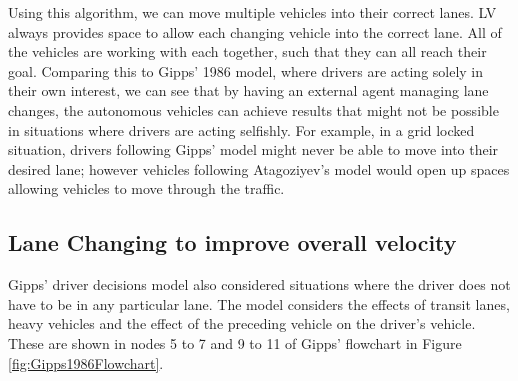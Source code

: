 Using this algorithm, we can move multiple vehicles into their correct lanes. LV always provides space to allow each changing vehicle into the correct lane. All of the vehicles are working with each together, such that they can all reach their goal. Comparing this to Gipps' 1986 model, where drivers are acting solely in their own interest, we can see that by having an external agent managing lane changes, the autonomous vehicles can achieve results that might not be possible in situations where drivers are acting selfishly. For example, in a grid locked situation, drivers following Gipps' model might never be able to move into their desired lane; however vehicles following Atagoziyev's model would open up spaces allowing vehicles to move through the traffic.

\subsection{Lane Changing to improve overall velocity}
\label{subsec:Lane Changing to improve overall velocity}
Gipps' driver decisions model also considered situations where the driver does not have to be in any particular lane. The model considers the effects of transit lanes, heavy vehicles and the effect of the preceding vehicle on the driver's vehicle. These are shown in nodes 5 to 7 and 9 to 11 of Gipps' flowchart in Figure \ref{fig:Gipps1986Flowchart}.

